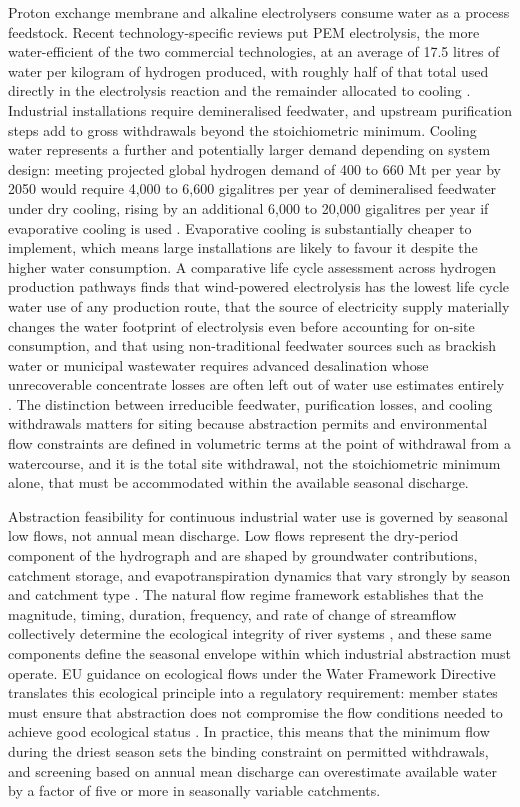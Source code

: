 \documentclass[draft]{agujournal2019}
\begin{document}
Proton exchange membrane and alkaline electrolysers consume water as a process feedstock. Recent technology-specific reviews put PEM electrolysis, the more water-efficient of the two commercial technologies, at an average of 17.5 litres of water per kilogram of hydrogen produced, with roughly half of that total used directly in the electrolysis reaction and the remainder allocated to cooling \cite{SantosSanchez2026}. Industrial installations require demineralised feedwater, and upstream purification steps add to gross withdrawals beyond the stoichiometric minimum. Cooling water represents a further and potentially larger demand depending on system design: meeting projected global hydrogen demand of 400 to 660 Mt per year by 2050 would require 4,000 to 6,600 gigalitres per year of demineralised feedwater under dry cooling, rising by an additional 6,000 to 20,000 gigalitres per year if evaporative cooling is used \cite{ELLERSDORFER20251002}. Evaporative cooling is substantially cheaper to implement, which means large installations are likely to favour it despite the higher water consumption. A comparative life cycle assessment across hydrogen production pathways finds that wind-powered electrolysis has the lowest life cycle water use of any production route, that the source of electricity supply materially changes the water footprint of electrolysis even before accounting for on-site consumption, and that using non-traditional feedwater sources such as brackish water or municipal wastewater requires advanced desalination whose unrecoverable concentrate losses are often left out of water use estimates entirely \cite{Qin2025}. The distinction between irreducible feedwater, purification losses, and cooling withdrawals matters for siting because abstraction permits and environmental flow constraints are defined in volumetric terms at the point of withdrawal from a watercourse, and it is the total site withdrawal, not the stoichiometric minimum alone, that must be accommodated within the available seasonal discharge.


Abstraction feasibility for continuous industrial water use is governed by seasonal low flows, not annual mean discharge. Low flows represent the dry-period component of the hydrograph and are shaped by groundwater contributions, catchment storage, and evapotranspiration dynamics that vary strongly by season and catchment type \cite{SMAKHTIN2001147}. The natural flow regime framework establishes that the magnitude, timing, duration, frequency, and rate of change of streamflow collectively determine the ecological integrity of river systems \cite{10.2307/1313099}, and these same components define the seasonal envelope within which industrial abstraction must operate. EU guidance on ecological flows under the Water Framework Directive translates this ecological principle into a regulatory requirement: member states must ensure that abstraction does not compromise the flow conditions needed to achieve good ecological status \cite{directive2014ecological}. In practice, this means that the minimum flow during the driest season sets the binding constraint on permitted withdrawals, and screening based on annual mean discharge can overestimate available water by a factor of five or more in seasonally variable catchments.
\end{document}
